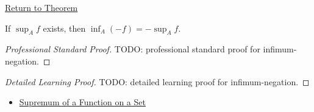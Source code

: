 \newpage
{}
\label{prf:infimum-negation}

\begin{remark*}[Return]
\hyperref[thm:infimum-negation]{Return to Theorem}
\end{remark*}

\begin{theorem*}
If \(\sup_A f\) exists, then \(\inf_A(-f)=-\sup_A f\).
\end{theorem*}

\begin{proof}[Professional Standard Proof]
\LRAProofBodyStart
TODO: professional standard proof for infimum-negation.
\end{proof}

\begin{proof}[Detailed Learning Proof]
\LRAProofBodyStart
TODO: detailed learning proof for infimum-negation.
\end{proof}

\begin{remark*}
\end{remark*}

\begin{dependencies}
\begin{itemize}
  \item \hyperref[def:function-supremum-on-set]{Supremum of a Function on a Set}
\end{itemize}
\end{dependencies}

\clearpage
